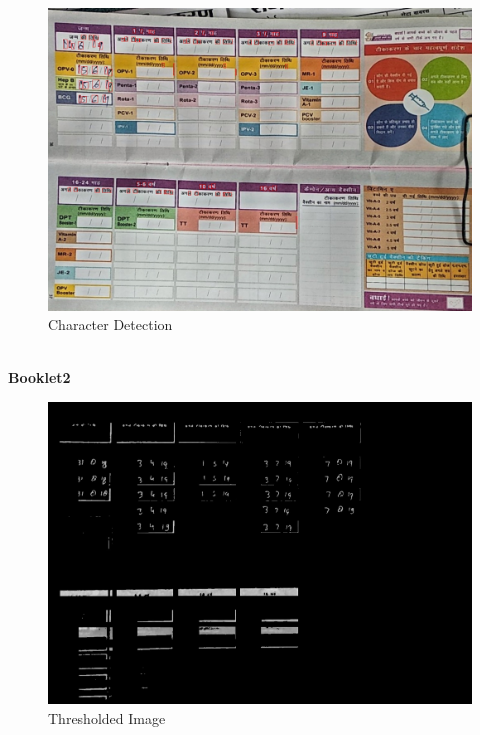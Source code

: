 \documentclass{article}
\begin{document}
    \begin{figure}[!htb]
    \minipage{\textwidth}
    \begin{center}
      \includegraphics[scale=.25]{4/.report/_char/b1.jpg}
      \caption{Character Detection}
    \end{center}
    \endminipage
    \end{figure}
\pagebreak \\
\textbf{Booklet2}
    \begin{figure}[!htb]
    \minipage{\textwidth}
    \begin{center}
      \includegraphics[scale=.25]{4/.report/_thresh/b2.jpg}
      \caption{Thresholded Image}
    \end{center}
    \endminipage
    \end{figure}
\end{document}
